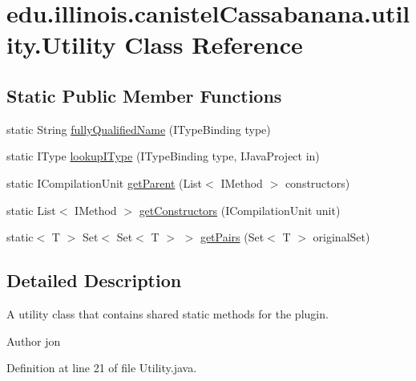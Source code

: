 \hypertarget{classedu_1_1illinois_1_1canistelCassabanana_1_1utility_1_1Utility}{
\section{edu.illinois.canistelCassabanana.utility.Utility Class Reference}
\label{classedu_1_1illinois_1_1canistelCassabanana_1_1utility_1_1Utility}
}
\subsection*{Static Public Member Functions}
\begin{DoxyCompactItemize}
\item 
static String \hyperlink{classedu_1_1illinois_1_1canistelCassabanana_1_1utility_1_1Utility_a7ad7b01b4ac985f843daae80a9b530f6}{fullyQualifiedName} (ITypeBinding type)
\item 
static IType \hyperlink{classedu_1_1illinois_1_1canistelCassabanana_1_1utility_1_1Utility_add7cd8f4956b7b5ebd90c8542183f21e}{lookupIType} (ITypeBinding type, IJavaProject in)
\item 
static ICompilationUnit \hyperlink{classedu_1_1illinois_1_1canistelCassabanana_1_1utility_1_1Utility_a45eff2f6304ebeb68bc077e77faaf41c}{getParent} (List$<$ IMethod $>$ constructors)
\item 
static List$<$ IMethod $>$ \hyperlink{classedu_1_1illinois_1_1canistelCassabanana_1_1utility_1_1Utility_a6cd2cf1ed4823a36a63fb36b4c31cdea}{getConstructors} (ICompilationUnit unit)
\item 
static$<$ T $>$ Set$<$ Set$<$ T $>$ $>$ \hyperlink{classedu_1_1illinois_1_1canistelCassabanana_1_1utility_1_1Utility_aa8be57d974d02d56e0ae832bedcdee08}{getPairs} (Set$<$ T $>$ originalSet)
\end{DoxyCompactItemize}


\subsection{Detailed Description}
A utility class that contains shared static methods for the plugin.

\begin{DoxyAuthor}{Author}
jon 
\end{DoxyAuthor}


Definition at line 21 of file Utility.java.



